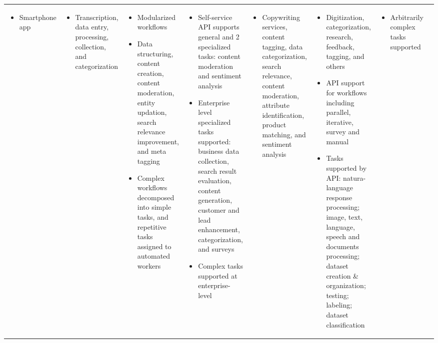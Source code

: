\documentclass{sigchi}
\begin{document}
\begin{sidewaystable*}
\begin{tabular}[h]{| p{1.5cm}| p{2.7cm}| p{2.7cm}| p{2.7cm}| p{2.7cm}| p{2.7cm}| p{2.7cm}| p{2.7cm}|}
{\begin{itemize} [noitemsep,nolistsep]
\item  Smartphone app
\end{itemize}
} &
{
\begin{itemize} [noitemsep,nolistsep]
\item  Transcription, data entry, processing, collection, and categorization
\end{itemize}
} &
{
\begin{itemize} [noitemsep,nolistsep]
\item  Modularized workflows
\item  Data structuring, content creation, content moderation, entity updation, search relevance improvement, and meta tagging
\item  Complex workflows decomposed into simple tasks, and repetitive tasks assigned to automated workers
\end{itemize}
} &
{
\begin{itemize} [noitemsep,nolistsep]
\item  Self-service API supports general and 2 specialized tasks: content moderation and sentiment analysis
\item  Enterprise level specialized tasks supported: business data collection, search result evaluation, content generation, customer and lead enhancement, categorization, and surveys
\item  Complex tasks supported at enterprise-level
\end{itemize}
} &
{
\begin{itemize} [noitemsep,nolistsep]
\item  Copywriting services, content tagging, data categorization, search relevance, content moderation, attribute identification, product matching, and sentiment analysis
\end{itemize}
} &
{
\begin{itemize} [noitemsep,nolistsep]
\item  Digitization, categorization, research, feedback, tagging, and others
\item  API support for workflows including parallel, iterative, survey and manual
\item  Tasks supported by API: natura-language response processing; image, text, language, speech and documents processing; dataset creation \& organization; testing; labeling; dataset classification
\end{itemize}
} &
{
\begin{itemize} [noitemsep,nolistsep]
\item  Arbitrarily complex tasks supported

\end{itemize}}
\end{tabular}
\end{sidewaystable*}
\end{document}
